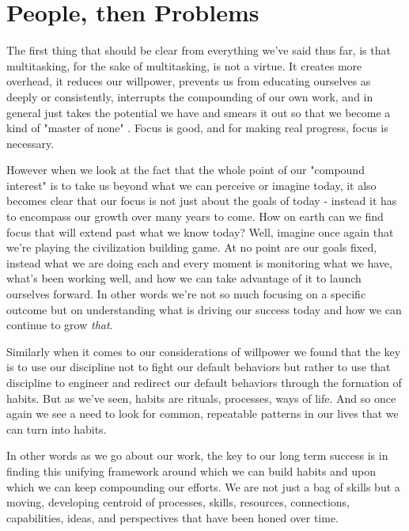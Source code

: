 \documentclass[11pt,a5paper]{book}
\begin{document}
\section{People, then Problems}
The first thing that should be clear from everything we've said thus far, is that multitasking, for the sake of multitasking, is not a virtue. It creates more overhead, it reduces our willpower, prevents us from educating ourselves as deeply or consistently, interrupts the compounding of our own work, and in general just takes the potential we have and smears it out so that we become a kind of "master of none" \cite{keller}. Focus is good, and for making real progress, focus is necessary. 
\newline

However when we look at the fact that the whole point of our "compound interest" is to take us beyond what we can perceive or imagine today, it also becomes clear that our focus is not just about the goals of today - instead it has to encompass our growth over many years to come. How on earth can we find focus that will extend past what we know today? Well, imagine once again that we're playing the civilization building game. At no point are our goals fixed, instead what we are doing each and every moment is monitoring what we have, what's been working well, and how we can take advantage of it to launch ourselves forward. In other words we're not so much focusing on a specific outcome but on understanding what is driving our success today and how we can continue to grow \textit{that}. 
\newline

Similarly when it comes to our considerations of willpower we found that the key is to use our discipline not to fight our default behaviors but rather to use that discipline to engineer and redirect our default behaviors through the formation of habits. But as we've seen, habits are rituals, processes, ways of life. And so once again we see a need to look for common, repeatable patterns in our lives that we can turn into habits. 
\newline

In other words as we go about our work, the key to our long term success is in finding this unifying framework around which we can build habits and upon which we can keep compounding our efforts. We are not just a bag of skills but a moving, developing centroid of processes, skills, resources, connections, capabilities, ideas, and perspectives that have been honed over time.
\newline
\end{document}
